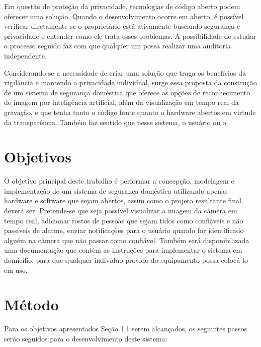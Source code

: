 \documentclass[12pt, %
openright, 
oneside, %
a4paper,    %
brazil]{facom-ufu-abntex2}
\begin{document}
Em questão de proteção da privacidade, tecnologias de código aberto podem oferecer uma solução. Quando o desenvolvimento
ocorre em aberto, é possível verificar diretamente se o proprietário está ativamente buscando segurança e privacidade e
entender como ele trata esses problemas. A possibilidade de estudar o processo seguido faz com que qualquer um possa
realizar uma auditoria independente. \cite{mardjan2016open}

Considerando-se a necessidade de criar uma solução que traga os benefícios da vigilância e mantendo a privacidade individual, surge
essa proposta da construção de um sistema de segurança doméstica que oferece as opções de reconhecimento de imagem
por inteligência artificial, além da visualização em tempo real da gravação, e que tenha tanto o código fonte quanto o hardware
abertos em virtude da transparência. Também faz sentido que nesse sistema, o usuário ou o 

\section{Objetivos}

O objetivo principal deste trabalho é performar a concepção, modelagem e implementação de um sistema de segurança doméstica utilizando
apenas hardware e software que sejam abertos, assim como o projeto resultante final deverá ser. Pretende-se que seja possível visualizar 
a imagem da câmera em tempo real, adicionar rostos de pessoas que sejam tidos como confiáveis e não passíveis de alarme, enviar notificações
para o usuário quando for identificado alguém na câmera que não passar como confiável. Também será disponibilizada uma documentação que 
contém as instruções para implementar o sistema em domicílio, para que qualquer indivíduo provido do equipamento possa colocá-lo em uso.

\section{Método}

Para os objetivos apresentados Seção 1.1 serem alcançados, os seguintes passos serão seguidos para o desenvolvimento deste sistema:
\end{document}
